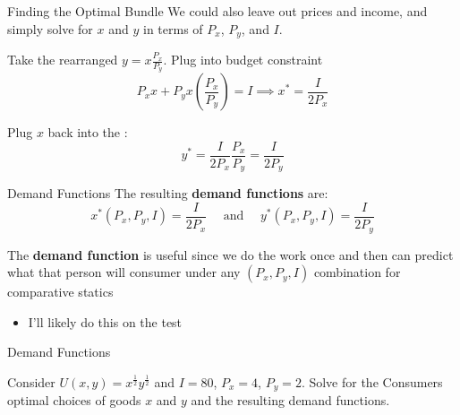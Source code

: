 \documentclass{beamer}
\begin{document}
\begin{frame}{Finding the Optimal Bundle}
  We could also leave out prices and income, and simply solve for $x$ and $y$ in terms of $P_x$, $P_y$, and $I$.
  
  \bigskip
  Take the rearranged  $y = x\frac{P_x}{P_y}$. Plug into budget constraint
  $$
    P_x x + P_y x (\frac{P_x}{P_y}) = I \implies x^* = \frac{I}{2P_x}
  $$ 
  
  \bigskip
  Plug $x$ back into the :
  $$
    y^* = \frac{I}{2P_x}\frac{P_x}{P_y} = \frac{I}{2P_y}
  $$
\end{frame}

\begin{frame}{Demand Functions}
  The resulting \textbf{demand functions} are:
  $$
    x^*(P_x, P_y, I) =  \frac{I}{2P_x} 
    \quad\text{ and }\quad
    y^*(P_x, P_y, I) = \frac{I}{2P_y}
  $$

  \bigskip
  The \textbf{demand function} is useful since we do the work once and then can predict what that person will consumer under any $(P_x, P_y, I)$ combination for comparative statics
  \begin{itemize}
    \item I'll likely do this on the test
  \end{itemize}
\end{frame}

\begin{frame}{Demand Functions}
  
  \bigskip
  Consider $U(x,y) = x^{\frac{1}{2}}y^{\frac{1}{2}}$ and $I=80$, $P_{x} = 4$, $P_{y}=2$. Solve for the Consumers optimal choices of goods $x$ and $y$ and the resulting demand functions.
\end{frame}
\end{document}

